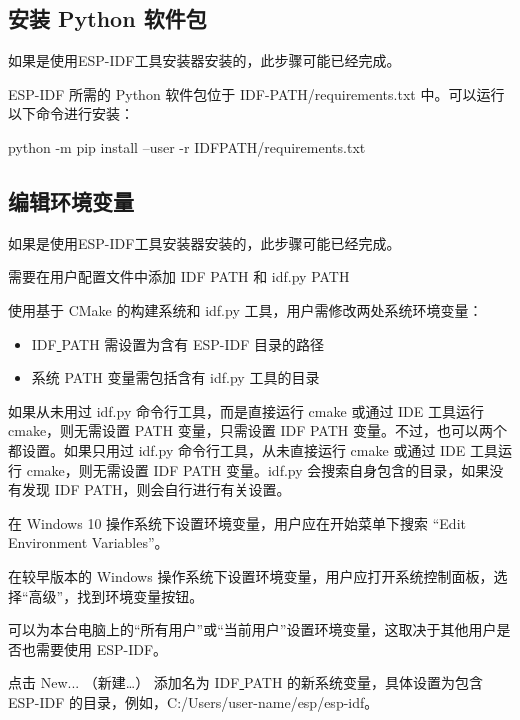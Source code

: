 \subsection{安装 Python 软件包}

如果是使用ESP-IDF工具安装器安装的，此步骤可能已经完成。

ESP-IDF 所需的 Python 软件包位于 IDF-PATH/requirements.txt 中。可以运行以下命令进行安装：


\begin{tcolorbox}
    python -m pip install --user -r IDFPATH/requirements.txt
\end{tcolorbox}

\subsection{编辑环境变量}

如果是使用ESP-IDF工具安装器安装的，此步骤可能已经完成。

需要在用户配置文件中添加 IDF PATH 和 idf.py PATH

使用基于 CMake 的构建系统和 idf.py 工具，用户需修改两处系统环境变量：

\begin{itemize}
    \item IDF\underline{ }PATH 需设置为含有 ESP-IDF 目录的路径
    \item 系统 PATH 变量需包括含有 idf.py 工具的目录
\end{itemize}

如果从未用过 idf.py 命令行工具，而是直接运行 cmake 或通过 IDE 工具运行 cmake，则无需设置 PATH 变量，只需设置 IDF PATH 变量。不过，也可以两个都设置。如果只用过 idf.py 命令行工具，从未直接运行 cmake 或通过 IDE 工具运行 cmake，则无需设置 IDF PATH 变量。idf.py 会搜索自身包含的目录，如果没有发现 IDF PATH，则会自行进行有关设置。

在 Windows 10 操作系统下设置环境变量，用户应在开始菜单下搜索 “Edit Environment Variables”。

在较早版本的 Windows 操作系统下设置环境变量，用户应打开系统控制面板，选择“高级”，找到环境变量按钮。

可以为本台电脑上的“所有用户”或“当前用户”设置环境变量，这取决于其他用户是否也需要使用 ESP-IDF。

点击 New... （新建…） 添加名为 IDF\underline{ }PATH 的新系统变量，具体设置为包含 ESP-IDF 的目录，例如，C:/Users/user-name/esp/esp-idf。

